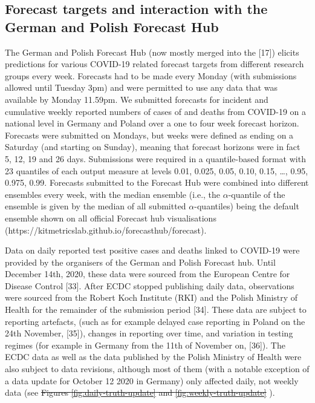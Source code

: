 \documentclass[10pt,letterpaper]{article}
\providecommand{\DIFaddtex}[1]{{\protect\color{blue}\uwave{#1}}} %
\providecommand{\DIFdeltex}[1]{{\protect\color{red}\sout{#1}}}                      %
\providecommand{\DIFaddbegin}{} %
\providecommand{\DIFaddend}{} %
\providecommand{\DIFdelbegin}{} %
\providecommand{\DIFdelend}{} %
\providecommand{\DIFadd}[1]{\texorpdfstring{\DIFaddtex{#1}}{#1}} %
\providecommand{\DIFdel}[1]{\texorpdfstring{\DIFdeltex{#1}}{}} %
\newcommand{\DIFscaledelfig}{0.5}
\newlength{\DIFdelgraphicswidth} %
\newlength{\DIFdelgraphicsheight} %
\newcommand{\DIFaddincludegraphics}[2][]{{\color{blue}\fbox{\DIFOincludegraphics[#1]{#2}}}} %
\newcommand{\DIFdelincludegraphics}[2][]{%
\sbox{\DIFdelgraphicsbox}{\DIFOincludegraphics[#1]{#2}}%
\settoboxwidth{\DIFdelgraphicswidth}{\DIFdelgraphicsbox} %
\settoboxtotalheight{\DIFdelgraphicsheight}{\DIFdelgraphicsbox} %
\scalebox{\DIFscaledelfig}{%
\parbox[b]{\DIFdelgraphicswidth}{\usebox{\DIFdelgraphicsbox}\\[-\baselineskip] \rule{\DIFdelgraphicswidth}{0em}}\llap{\resizebox{\DIFdelgraphicswidth}{\DIFdelgraphicsheight}{%
\setlength{\unitlength}{\DIFdelgraphicswidth}%
\begin{picture}(1,1)%
\thicklines\linethickness{2pt} %
{\color[rgb]{1,0,0}\put(0,0){\framebox(1,1){}}}%
{\color[rgb]{1,0,0}\put(0,0){\line( 1,1){1}}}%
{\color[rgb]{1,0,0}\put(0,1){\line(1,-1){1}}}%
\end{picture}%
}\hspace*{3pt}}} %
} %
\DeclareRobustCommand{\DIFaddbegin}{\DIFOaddbegin \let\includegraphics\DIFaddincludegraphics} %
\DeclareRobustCommand{\DIFaddend}{\DIFOaddend \let\includegraphics\DIFOincludegraphics} %
\DeclareRobustCommand{\DIFdelbegin}{\DIFOdelbegin \let\includegraphics\DIFdelincludegraphics} %
\DeclareRobustCommand{\DIFdelend}{\DIFOaddend \let\includegraphics\DIFOincludegraphics} %
\begin{document}
\hypertarget{forecast-targets-and-interaction-with-the-german-and-polish-forecast-hub}{%
\subsection{Forecast targets and interaction with the German and Polish
Forecast
Hub}\label{forecast-targets-and-interaction-with-the-german-and-polish-forecast-hub}}

The German and Polish Forecast Hub (now mostly merged into the {[}17{]})
elicits predictions for various COVID-19 related forecast targets from
different research groups every week. Forecasts had to be made every
Monday (with submissions allowed until Tuesday 3pm) and were permitted
to use any data that was available by Monday 11.59pm. We submitted
forecasts for incident and cumulative weekly reported numbers of cases
of and deaths from COVID-19 on a national level in Germany and Poland
over a one to four week forecast horizon. Forecasts were submitted on
Mondays, but weeks were defined as ending on a Saturday (and starting on
Sunday), meaning that forecast horizons were in fact 5, 12, 19 and 26
days. Submissions were required in a quantile-based format with 23
quantiles of each output measure at levels 0.01, 0.025, 0.05, 0.10,
0.15, \ldots, 0.95, 0.975, 0.99. Forecasts submitted to the Forecast Hub
were combined into different ensembles every week, with the median
ensemble (i.e., the \(\alpha\)-quantile of the ensemble is given by the
median of all submitted \(\alpha\)-quantiles) being the default ensemble
shown on all official Forecast hub visualisations
(https://kitmetricslab.github.io/forecasthub/forecast).

Data on daily reported test positive cases and deaths linked to COVID-19
were provided by the organisers of the German and Polish Forecast hub.
Until December 14th, 2020, these data were sourced from the European
Centre for Disease Control {[}33{]}. After ECDC stopped publishing daily
data, observations were sourced from the Robert Koch Institute (RKI) and
the Polish Ministry of Health for the remainder of the submission period
{[}34{]}. These data are subject to reporting artefacts, (such as for
example delayed case reporting in Poland on the 24th November,
{[}35{]}), changes in reporting over time, and variation in testing
regimes (for example in Germany from the 11th of November on, {[}36{]}).
The ECDC data as well as the data published by the Polish Ministry of
Health were also subject to data revisions, although most of them (with
a notable exception of a data update for October 12 2020 in Germany)
only affected daily, not weekly data (see
\DIFdelbegin \DIFdel{Figures
\ref{fig:daily-truth-update} and \ref{fig:weekly-truth-update}}\DIFdelend \DIFaddbegin {} \DIFadd{and }
\DIFadd{Figs}\DIFaddend ).
\end{document}
